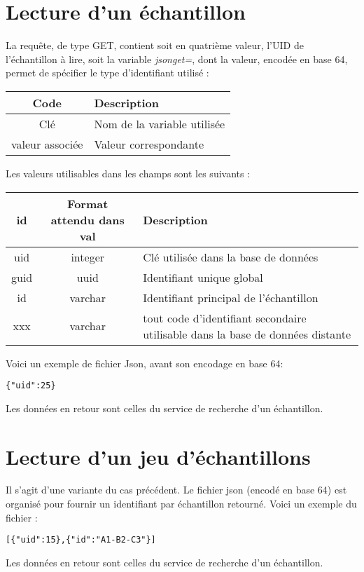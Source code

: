 \section{Lecture d'un échantillon}

La requête, de type GET, contient soit en quatrième valeur, l'UID de l'échantillon à lire, soit la variable \textit{jsonget=}, dont la valeur, encodée en base 64, permet de spécifier le type d'identifiant utilisé :
\begin{longtable}{|c|>{\raggedright\arraybackslash}p{6cm}|}
\hline 
Code & Description \\ 
\hline
Clé & Nom de la variable utilisée \\
\hline
valeur associée & Valeur correspondante\\
\endhead

\end{longtable}

Les valeurs utilisables dans les champs sont les suivants :
\begin{longtable}{|c|c|>{\raggedright\arraybackslash}p{6cm}|}
\hline 
id & Format attendu dans val & Description \\ 
\hline
uid & integer & Clé utilisée dans la base de données \\
\hline
guid & uuid & Identifiant unique global \\
\hline
id & varchar & Identifiant principal de l'échantillon\\
\hline
xxx & varchar & tout code d'identifiant secondaire utilisable dans la base de données distante \\
\hline \endhead

\end{longtable}

Voici un exemple de fichier Json, avant son encodage en base 64:
\begin{lstlisting}
{"uid":25}
\end{lstlisting}

Les données en retour sont celles du service de recherche d'un échantillon.

\section{Lecture d'un jeu d'échantillons}

Il s'agit d'une variante du cas précédent. Le fichier json (encodé en base 64) est organisé pour fournir un identifiant par échantillon retourné. Voici un exemple du fichier :
\begin{lstlisting}
[{"uid":15},{"id":"A1-B2-C3"}]
\end{lstlisting}
Les données en retour sont celles du service de recherche d'un échantillon.

